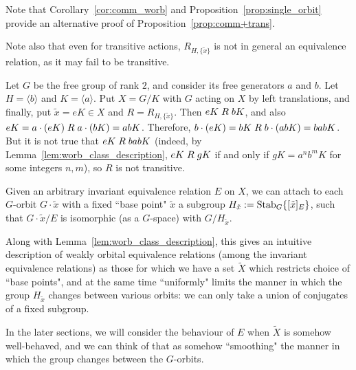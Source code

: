 	Note that Corollary~\ref{cor:comm_worb} and Proposition~\ref{prop:single_orbit} provide an alternative proof of Proposition~\ref{prop:comm+trans}.
	
	Note also that even for transitive actions, $R_{H,\{\tilde x\}}$ is not in general an equivalence relation, as it may fail to be transitive.
	
	\begin{ex}
		Let $G$ be the free group of rank $2$, and consider its free generators $a$ and $b$. Let $H=\langle b\rangle$ and $K=\langle a\rangle$. Put $X=G/K$ with $G$ acting on $X$ by left translations, and finally, put $\tilde x=eK\in X$ and $R=R_{H,\{\tilde x \}}$. Then $eK\mathrel{R} bK$, and also $eK=a\cdot (eK)\mathrel{R} a\cdot (bK)=abK$. Therefore, $b\cdot (eK)=bK\mathrel{R} b\cdot(abK)=babK$. But it is not true that $eK\mathrel{R} babK$ (indeed, by Lemma~\ref{lem:worb_class_description}, $eK\mathrel{R} gK$ if and only if $gK=a^nb^mK$ for some integers $n,m$), so $R$ is not transitive.\xqed{\lozenge}
	\end{ex}
	
	
	
	\begin{rem}
		\label{rem:worb_interpret}
		Given an arbitrary invariant equivalence relation $E$ on $X$, we can attach to each $G$-orbit $G\cdot \tilde x$ with a fixed ``base point" $\tilde x$ a subgroup $H_{\tilde x}:=\operatorname{{Stab}}_G\{[\tilde x ]_E\}$, such that $G\cdot {\tilde x}/E$ is isomorphic (as a $G$-space) with $G/H_{\tilde x}$.
		
		Along with Lemma~\ref{lem:worb_class_description}, this gives an intuitive description of weakly orbital equivalence relations (among the invariant equivalence relations) as those for which we have a set $\tilde X$ which restricts choice of ``base points", and at the same time ``uniformly" limits the manner in which the group $H_{\tilde x}$ changes between various orbits: we can only take a union of conjugates of a fixed subgroup.
		
		In the later sections, we will consider the behaviour of $E$ when $\tilde X$ is somehow well-behaved, and we can think of that as somehow ``smoothing" the manner in which the group changes between the $G$-orbits.\xqed{\lozenge}
	\end{rem}
	
	
	
	
